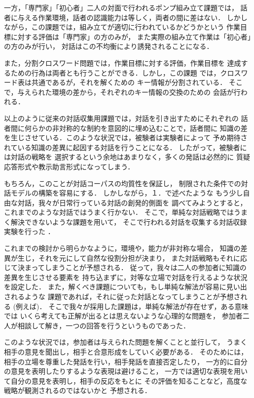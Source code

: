 一方，「専門家」「初心者」二人の対面で行われるポンプ組み立て課題では，
話者に与える作業環境，話者の認識能力は等しく，両者の間に差はない．
しかしながら，この課題では，組み立てが適切に行われているかどうかという
作業目標に対する評価は「専門家」の方のみが，
また実際の組み立て作業は「初心者」の方のみが行い，
対話はこの不均衡により誘発されることになる．

また，分割クロスワード問題では，作業目標に対する評価，作業目標を
達成するための行為は両者とも行うことができる．しかし，この課題
では，クロスワード表は共通であるが，それを解くための
キー情報が分割されている．
そこで，与えられた環境の差から，それぞれのキー情報の交換のための
会話が行われる．

以上のように従来の対話収集用課題では，対話を引き出すためにそれぞれの
話者間に何らかの非対称的な制約を意図的に埋め込むことで，話者間に
知識の差を生じさせている．このような状況では，被験者は実験者によって
予め期待されている知識の差異に起因する対話を行うことになる．
したがって，被験者には対話の戦略を
選択するという余地はあまりなく，多くの発話は必然的に
質疑応答形式や教示助言形式になってしまう．

もちろん，このことが対話コーパスの均質性を保証し，
制限された条件での対話モデルの構築を容易にする．
しかしながら，１．で述べたような
もう少し自由な対話，我々が日常行っている対話の創発的側面を
調べてみようとすると，これまでのような対話ではうまく行かない．
そこで，単純な対話戦略ではうまく解決できないような課題を用いて，
そこで行われる対話を収集する対話収録実験を行った
\cite{YanoAndIto1996a,YanoAndIto1996b,YanoAndIto1996c}．

これまでの検討から明らかなように，環境や，能力が非対称な場合，
知識の差異が生じ，それを元にして自然な役割分担が決まり，
また対話戦略もそれに応じて決まってしまうことが予想される．
従って，我々は二人の参加者に知識の差異を生じさせる要素を
持ち込まずに，対等な立場で対話を行えるような状況を設定した．
また，解くべき課題についても，もし単純な解法が容易に見い出されるような
課題であれば，それに従った対話となってしまうことが予想される
(例えば\cite{Sato1996})．
そこで我々が採用した課題は，単純な解法が存在せず，ある意味では
いくら考えても正解が出るとは思えないような心理的な問題を，
参加者二人が相談して解き，一つの回答を行うというものであった．

このような状況では，参加者は与えられた問題を解くことと並行して，
うまく相手の意見を聞出し，相手と合意形成をしていく必要がある．
そのためには，相手の立場を尊重した発話を行い，相手発話を直接否定したり，
一方的に自分の意見を表明したりするような表現は避けること，
一方では適切な表現を用いて自分の意見を表明し，相手の反応をもとに
その評価を知ることなど，高度な戦略が観測されるのではないかと
予想される．

